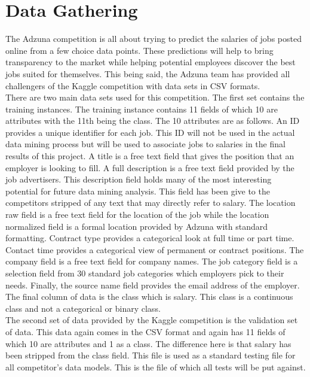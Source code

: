 \section{Data Gathering}
\label{sec:gathering}

The Adzuna competition is all about trying to predict the salaries of jobs posted online from a few choice data
points. These predictions will help to bring transparency to the market while helping potential employees discover
the best jobs suited for themselves. This being said, the Adzuna team has provided all challengers of the Kaggle
competition with data sets in CSV formats.\\

There are two main data sets used for this competition. The first set contains the training instances. The
training instance contains 11 fields of which 10 are attributes with the 11th being the class. The 10
attributes are as follows. An ID provides a unique identifier for each job. This ID will not be used in the
actual data mining process but will be used to associate jobs to salaries in the final results of this project.
A title is a free text field that gives the position that an employer is looking to fill. A full description
is a free text field provided by the job advertisers. This description field holds many of the most interesting
potential for future data mining analysis. This field has been give to the competitors stripped of any 
text that may directly refer to salary. The location raw field is a free text field for the location of
the job while the location normalized field is a formal location provided by Adzuna with standard formatting.
Contract type provides a categorical look at full time or part time. Contact time provides a categorical
view of permanent or contract positions. The company field is a free text field for company names. The 
job category field is a selection field from 30 standard job categories which employers pick to their needs.
Finally, the source name field provides the email address of the employer. The final column of data is the class
which is salary. This class is a continuous class and not a categorical or binary class.\\

The second set of data provided by the Kaggle competition is the validation set of data. This data
again comes in the CSV format and again has 11 fields of which 10 are attributes and 1 as a class. The
difference here is that salary has been stripped from the class field. This file is used as a standard
testing file for all competitor's data models. This is the file of which all tests will be put against.\\

